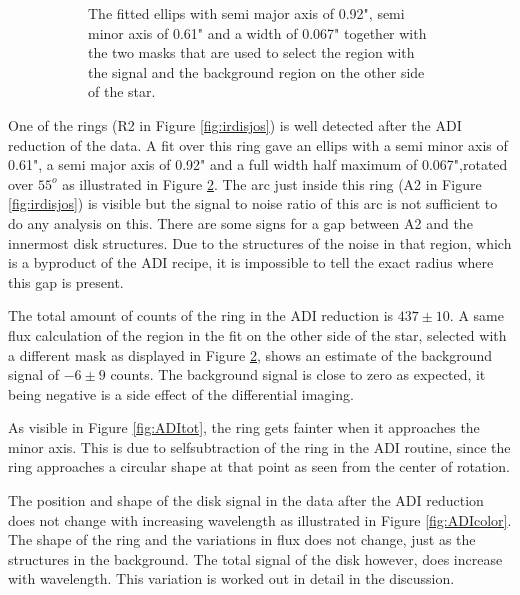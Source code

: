 \documentclass[twoside,single]{lion-msc}
\begin{document}
\begin{figure}[!b]
\begin{subfigure}{.48\textwidth}
  \caption{The fitted ellips with semi major axis of 0.92", semi minor axis of 0.61" and a width of 0.067" together with the two masks that are used to select the region with the signal and the background region on the other side of the star.}
  \label{fig:ADIfit}
\end{subfigure}
\caption{}
\end{figure}

One of the rings (R2 in Figure \ref{fig:irdisjos}) is well detected after the ADI reduction of the data. A fit over this ring gave an ellips with a semi minor axis of 0.61", a semi major axis of 0.92" and a full width half maximum of 0.067",rotated over $55^o$ as illustrated in Figure \ref{fig:ADIfit}. The arc just inside this ring (A2 in Figure \ref{fig:irdisjos}) is visible but the signal to noise ratio of this arc is not sufficient to do any analysis on this. There are some signs for a gap between A2 and the innermost disk structures. Due to the structures of the noise in that region, which is a byproduct of the ADI recipe, it is impossible to tell the exact radius where this gap is present.
\bigskip

The total amount of counts of the ring in the ADI reduction is $437\pm 10$. A same flux calculation of the region in the fit on the other side of the star, selected with a different mask as displayed in Figure \ref{fig:ADIfit}, shows an estimate of the background signal of $-6\pm 9$ counts. The background signal is close to zero as expected, it being negative is a side effect of the differential imaging. 
\bigskip

As visible in Figure \ref{fig:ADItot}, the ring gets fainter when it approaches the minor axis. This is due to selfsubtraction of the ring in the ADI routine, since the ring approaches a circular shape at that point as seen from the center of rotation.
\bigskip

The position and shape of the disk signal in the data after the ADI reduction does not change with increasing wavelength as illustrated in Figure \ref{fig:ADIcolor}. The shape of the ring and the variations in flux does not change, just as the structures in the background. The total signal of the disk however, does increase with wavelength. This variation is worked out in detail in the discussion.
\end{document}

